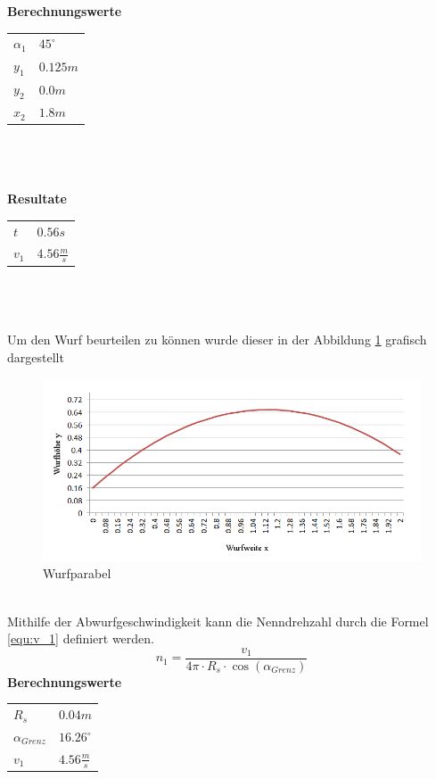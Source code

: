 \textbf{Berechnungswerte}\\
\begin{tabular}{ll}
	\rule{0pt}{11pt} $\alpha_1$ & $45^\circ$ \\
	\rule{0pt}{11pt} $y_1$ & $0.125 m$ \\
	\rule{0pt}{11pt} $y_2$ & $0.0 m$ \\
	\rule{0pt}{11pt} $x_2$ & $1.8 m$ \\
\end{tabular}\\
\\
\\
\textbf{Resultate}\\
\begin{tabular}{ll}
	\rule{0pt}{11pt} $t$ & $0.56 s$ \\
	\rule{0pt}{11pt} $v_1$ & $4.56 \frac{m}{s}$ \\
\end{tabular}\\
\\
\\
Um den Wurf beurteilen zu können wurde dieser in der Abbildung \ref{fig:Wurfparabel} 
grafisch dargestellt
\begin{figure}[h!]
	\centering
	\includegraphics[width=1\textwidth,clip,trim=7mm 7mm 7mm 0mm]
	{Enddokumentation/Anhang/Bilder/Schiefer_Wurf.jpg}
	\caption{Wurfparabel}
	\label{fig:Wurfparabel}
\end{figure}\\
Mithilfe der Abwurfgeschwindigkeit kann die Nenndrehzahl durch die Formel 
\ref{equ:v_1} definiert werden.
\begin{equation}  
    n_1 = \frac{v_1}{4\pi \cdot R_s \cdot \cos(\alpha_{Grenz})}
    \label{equ:v_1}
\end{equation}
\textbf{Berechnungswerte}\\
\begin{tabular}{ll}
	\rule{0pt}{11pt} $R_s$ & $0.04 m$ \\
	\rule{0pt}{11pt} $\alpha_{Grenz}$ & $16.26^\circ$ \\
	\rule{0pt}{11pt} $v_1$ & $4.56 \frac{m}{s}$ \\
\end{tabular}\\
